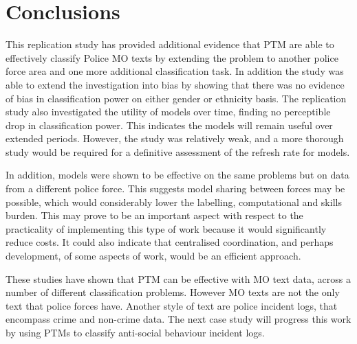\section{Conclusions}This replication study has provided additional evidence that PTM are able to effectively classify Police MO texts by extending the problem to another police force area and one more additional classification task. In addition the study was able to extend the investigation into bias by showing that there was no evidence of bias in classification power on either gender or ethnicity basis. The replication study also investigated the utility of models over time, finding no perceptible drop in classification power. This indicates the models will remain useful over extended periods. However, the study was relatively weak,  and a more thorough study would be required for a definitive assessment of the refresh rate for models. 

In addition, models were  shown to be effective on the same problems but on data from a different police force. This suggests model sharing between forces may be possible,  which would considerably lower the labelling, computational and skills burden. This may prove to be an important aspect with respect to the practicality of implementing this type of work because it would significantly reduce costs. It could also indicate that centralised coordination, and perhaps development, of some aspects of work, would be an efficient approach. 

These studies have shown that PTM can be effective with MO text data, across a number of different classification problems. However MO texts are not the only text that police forces have. Another style of text are police incident logs, that encompass crime and non-crime data. The next case study will progress this work  by using PTMs to classify anti-social behaviour incident logs.
 






